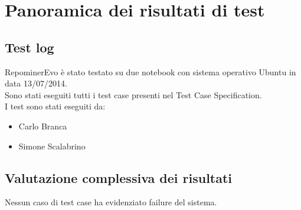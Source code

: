 \chapter{Panoramica dei risultati di test}

\section{Test log}

RepominerEvo è stato testato su due notebook con sistema operativo Ubuntu in data 13/07/2014.\\
Sono stati eseguiti tutti i test case presenti nel Test Case Specification.\\
I test sono stati eseguiti da:
\begin{itemize}
\item Carlo Branca
\item Simone Scalabrino
\end{itemize}

\section{Valutazione complessiva dei risultati}

Nessun caso di test case ha evidenziato failure del sistema.\\

\clearpage